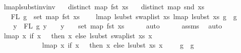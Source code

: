 \begin{isabellebody}
\ lmap{\isacharunderscore}{\kern0pt}lsubst{\isacharunderscore}{\kern0pt}inv{\isacharunderscore}{\kern0pt}inv{\isacharcolon}{\kern0pt}\isanewline
\ \ \ {\isachardoublequoteopen}distinct\ {\isacharparenleft}{\kern0pt}map\ fst\ xs{\isacharparenright}{\kern0pt}{\isachardoublequoteclose}\isanewline
\ \ \ {\isachardoublequoteopen}distinct\ {\isacharparenleft}{\kern0pt}map\ snd\ xs{\isacharparenright}{\kern0pt}{\isachardoublequoteclose}\isanewline
\ \ \ {\isachardoublequoteopen}FL\ g\ {\isasymsubseteq}\ set\ {\isacharparenleft}{\kern0pt}map\ fst\ xs{\isacharparenright}{\kern0pt}{\isachardoublequoteclose}\isanewline
\ \ \ \ {\isachardoublequoteopen}lmap\ {\isacharparenleft}{\kern0pt}lsubst\ {\isacharparenleft}{\kern0pt}swap{\isacharunderscore}{\kern0pt}list\ xs{\isacharparenright}{\kern0pt}{\isacharparenright}{\kern0pt}\ {\isacharparenleft}{\kern0pt}lmap\ {\isacharparenleft}{\kern0pt}lsubst\ xs{\isacharparenright}{\kern0pt}\ g{\isacharparenright}{\kern0pt}\ {\isacharequal}{\kern0pt}\ g{\isachardoublequoteclose}\isanewline
%
\isadelimproof
%
\endisadelimproof
%
\isatagproof
{}\isamarkupfalse%
\ {\isacharminus}{\kern0pt}\isanewline
\ \ \isamarkupfalse%
\ {\isachardoublequoteopen}{\isasymforall}y\ {\isasymin}\ FL\ g{\isachardot}{\kern0pt}\ y\ {\isachargreater}{\kern0pt}{\isacharequal}{\kern0pt}\ {}\ {\isacharminus}{\kern0pt}{\isacharminus}{\kern0pt}{\isachargreater}{\kern0pt}\ y\ {\isacharminus}{\kern0pt}\ {}\ {\isasymin}\ set\ {\isacharparenleft}{\kern0pt}map\ fst\ xs{\isacharparenright}{\kern0pt}{\isachardoublequoteclose}\isanewline
\ \ \ \ \isamarkupfalse%
\ auto\isanewline
\ \ \ \ \isamarkupfalse%
\ assms{\isacharparenleft}{\kern0pt}{}{\isacharparenright}{\kern0pt}\ \isamarkupfalse%
\ auto\isanewline
\ \ \isamarkupfalse%
\ \isamarkupfalse%
\ {\isachardoublequoteopen}lmap\ {\isacharparenleft}{\kern0pt}{\isasymlambda}x{\isachardot}{\kern0pt}\ if\ x\ {\isacharless}{\kern0pt}\ {}\ then\ x\ else\ {\isacharparenleft}{\kern0pt}lsubst\ {\isacharparenleft}{\kern0pt}swap{\isacharunderscore}{\kern0pt}list\ xs{\isacharparenright}{\kern0pt}\ {\isacharparenleft}{\kern0pt}x\ {\isacharminus}{\kern0pt}\ {}{\isacharparenright}{\kern0pt}\ {\isacharplus}{\kern0pt}\ {}{\isacharparenright}{\kern0pt}{\isacharparenright}{\kern0pt}\isanewline
\ \ \ \ \ \ \ \ \ \ \ \ {\isacharparenleft}{\kern0pt}lmap\ {\isacharparenleft}{\kern0pt}{\isasymlambda}x{\isachardot}{\kern0pt}\ if\ x\ {\isacharless}{\kern0pt}\ {}\ then\ x\ else\ {\isacharparenleft}{\kern0pt}lsubst\ xs\ {\isacharparenleft}{\kern0pt}x\ {\isacharminus}{\kern0pt}\ {}{\isacharparenright}{\kern0pt}\ {\isacharplus}{\kern0pt}\ {}{\isacharparenright}{\kern0pt}{\isacharparenright}{\kern0pt}\ g{\isacharparenright}{\kern0pt}\ {\isacharequal}{\kern0pt}\ g{\isachardoublequoteclose}\isanewline

\end{isabellebody}
